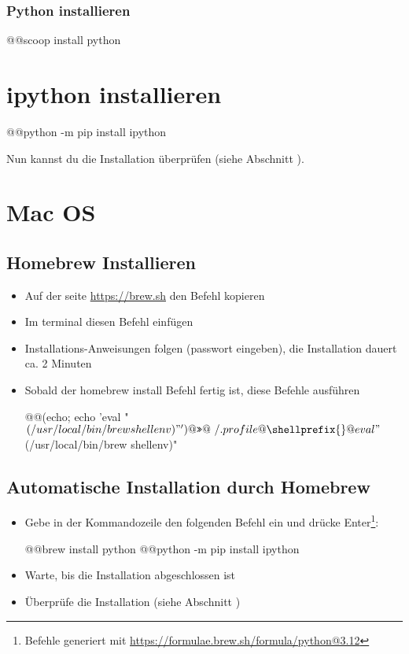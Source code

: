 \subsubsection*{Python installieren}
\begin{commandshell}
    @\shellprefix{}@scoop install python
\end{commandshell}
\section*{ipython installieren}
\begin{commandshell}
@\shellprefix{}@python -m pip install ipython
\end{commandshell}
Nun kannst du die Installation überprüfen (siehe Abschnitt ).

\section*{Mac OS}

\subsection*{Homebrew Installieren}
\begin{itemize}
    \item Auf der seite \url{https://brew.sh} den Befehl kopieren
    \item Im terminal diesen Befehl einfügen
    \item Installations-Anweisungen folgen (passwort eingeben), die Installation dauert ca. 2 Minuten
    \item Sobald der homebrew install Befehl fertig ist, diese Befehle ausführen
    \begin{commandshell}
@\shellprefix{}@(echo; echo 'eval "$(/usr/local/bin/brew shellenv)"') @\texttt{>>}@ ~/.profile
@\shellprefix{}@eval "$(/usr/local/bin/brew shellenv)"
    \end{commandshell}
\end{itemize}

\subsection*{Automatische Installation durch Homebrew}
\begin{itemize}
    \item Gebe in der Kommandozeile den folgenden Befehl ein und drücke Enter\footnote{Befehle generiert mit \url{https://formulae.brew.sh/formula/python@3.12}}:
\begin{commandshell}
@\shellprefix{}@brew install python
@\shellprefix{}@python -m pip install ipython
\end{commandshell}
    \item Warte, bis die Installation abgeschlossen ist
    \item Überprüfe die Installation (siehe Abschnitt )
\end{itemize}


